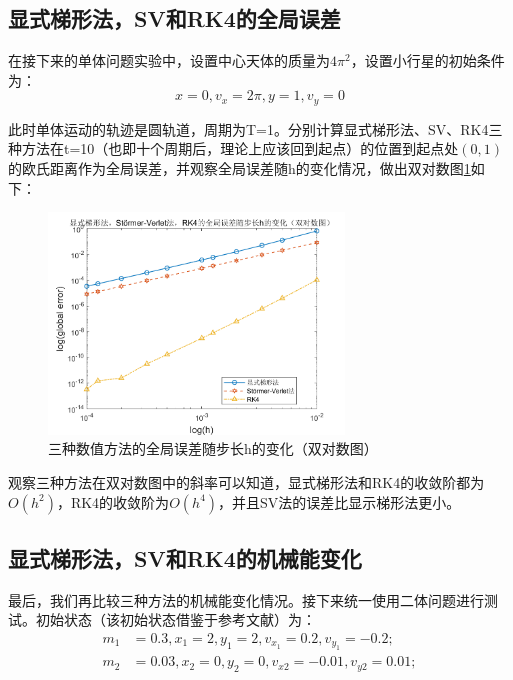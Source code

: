 \documentclass{article}
\begin{document}
\subsection{显式梯形法，SV和RK4的全局误差}
\par 在接下来的单体问题实验中，设置中心天体的质量为$4\pi^2$，设置小行星的初始条件为：
$${x=0}, {v_x=2\pi}, {y=1},{v_y=0}$$
\par 此时单体运动的轨迹是圆轨道，周期为T=1。分别计算显式梯形法、SV、RK4三种方法在t=10（也即十个周期后，理论上应该回到起点）的位置到起点处$(0,1)$的欧氏距离作为全局误差，并观察全局误差随h的变化情况，做出双对数图\ref{globalError}如下：
\begin{figure}[H]
	\centering  %
	\includegraphics[width=0.7\textwidth]{圆轨道-轨道误差//三种方法的全局误差随步长h的变化（双对数图）}
	\caption{三种数值方法的全局误差随步长h的变化（双对数图）}
	\label{globalError}
\end{figure}
\par 观察三种方法在双对数图中的斜率可以知道，显式梯形法和RK4的收敛阶都为$O(h^2)$，RK4的收敛阶为$O(h^4)$，并且SV法的误差比显示梯形法更小。

\subsection{显式梯形法，SV和RK4的机械能变化}
\par 最后，我们再比较三种方法的机械能变化情况。接下来统一使用二体问题进行测试。初始状态（该初始状态借鉴于参考文献\cite{sauer2018数值分析}）为：
\begin{align*}
	m_1&=0.3,x_1=2,y_1=2,v_{x_1}=0.2,v_{y_1}=-0.2;\\
	m_2&=0.03,x_2=0,y_2=0,v_{x2}=-0.01,v_{y2}=0.01;
\end{align*}
\end{document}
